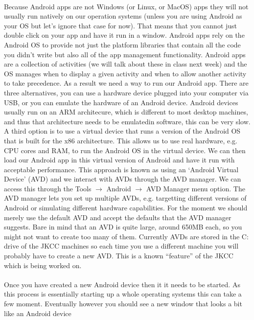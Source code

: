 \paragraph{} Because Android apps are not Windows (or Linux, or MacOS) apps they will not usually run natively on our operation systems (unless you are using Android as your OS but let's ignore that case for now). That means that you cannot just double click on your app and have it run in a window. Android apps rely on the Android OS to provide not just the platform libraries that contain all the code you didn't write but also all of the app management functionality. Android apps are a collection of activities (we will talk about these in class next week) and the OS manages when to display a given activity and when to allow another activity to take precedence. As a result we need a way to run our Android app. There are three alternatives, you can use a hardware device plugged into your computer via USB, or you can emulate the hardware of an Android device. Android devices usually run on an ARM architecure, which is different to most desktop machines, and thus that architecture needs to be emulatedin software, this can be very slow. A third option is to use a virtual device that runs a version of the Android OS that is built for the x86 architecture. This allows us to use real hardware, e.g. CPU cores and RAM, to run the Android OS in the virtual device. We can then load our Android app in this virtual version of Android and have it run with acceptable performance. This approach is known as using an `Android Virtual Device' (AVD) and we interact with AVDs through the AVD manager. We can access this through the Tools $\to$ Android $\to$ AVD Manager menu option. The AVD manager lets you set up multiple AVDs, e.g. targetting different versions of Android or simulating different hardware capabilities. For the moment we should merely use the default AVD and accept the defaults that the AVD manager suggests. Bare in mind that an AVD is quite large, around 650MB each, so you might not want to create too many of them. Currently AVDs are stored in the C: drive of the JKCC machines so each time you use a different machine you will probably have to create a new AVD. This is a known ``feature'' of the JKCC which is being worked on. 

\paragraph{} Once you have created a new Android device then it it needs to be started. As this process is essentially starting up a whole operating systems this can take a few moment. Eventually however you should see a new window that looks a bit like an Android device

